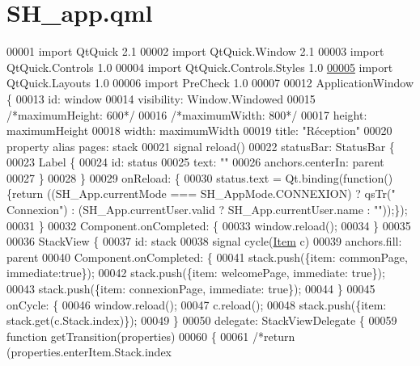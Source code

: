 \hypertarget{SH__app_8qml}{\section{S\-H\-\_\-app.\-qml}
\label{SH__app_8qml}
}

\begin{DoxyCode}
00001 \textcolor{keyword}{import} QtQuick 2.1
00002 import QtQuick.Window 2.1
00003 import QtQuick.Controls 1.0
00004 import QtQuick.Controls.Styles 1.0
\hypertarget{SH__app_8qml_source_l00005}{}\hyperlink{classSH__app}{00005} import QtQuick.Layouts 1.0
00006 import PreCheck 1.0
00007 
00012 ApplicationWindow \{
00013     \textcolor{keywordtype}{id}: window
00014     visibility: Window.Windowed
00015     \textcolor{comment}{/*maximumHeight: 600*/}
00016     \textcolor{comment}{/*maximumWidth: 800*/}
00017     height: maximumHeight
00018     width: maximumWidth
00019     title: \textcolor{stringliteral}{"Réception"}
00020     \textcolor{keyword}{property} alias pages: stack
00021     signal reload()
00022     statusBar: StatusBar \{
00023         Label \{
00024             \textcolor{keywordtype}{id}: status
00025             text: \textcolor{stringliteral}{""}
00026             anchors.centerIn: parent
00027         \}
00028     \}
00029     onReload: \{
00030         status.text = Qt.binding(\textcolor{keyword}{function}() \{\textcolor{keywordflow}{return} ((SH\_App.currentMode === SH\_AppMode.CONNEXION) ? qsTr(\textcolor{stringliteral}{"
      Connexion"}) : (SH\_App.currentUser.valid ? SH\_App.currentUser.name : \textcolor{stringliteral}{""}));\});
00031     \}
00032     Component.onCompleted: \{
00033         window.reload();
00034     \}
00035 
00036     StackView \{
00037         \textcolor{keywordtype}{id}: stack
00038         signal cycle(\hyperlink{classItem}{Item} c)
00039         anchors.fill: parent
00040         Component.onCompleted: \{
00041             stack.push(\{item: commonPage, immediate:\textcolor{keyword}{true}\});
00042             stack.push(\{item: welcomePage, immediate: \textcolor{keyword}{true}\});
00043             stack.push(\{item: connexionPage, immediate: \textcolor{keyword}{true}\});
00044         \}
00045         onCycle: \{
00046             window.reload();
00047             c.reload();
00048             stack.push(\{item: stack.get(c.Stack.index)\});
00049         \}
00050         delegate: StackViewDelegate \{
00059             \textcolor{keyword}{function} getTransition(properties)
00060             \{
00061                 \textcolor{comment}{/*return (properties.enterItem.Stack.index %
}
\end{DoxyCode}
